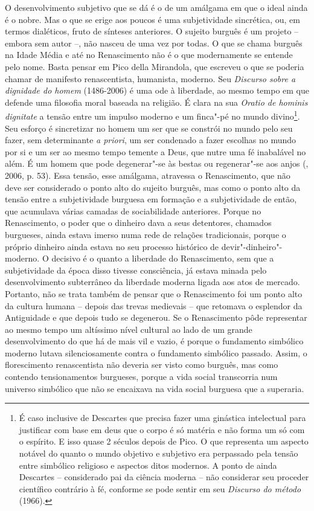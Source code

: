 O desenvolvimento subjetivo que se dá é o de um amálgama em que o ideal
ainda é o nobre. Mas o que se erige aos poucos é uma subjetividade
sincrética, ou, em termos dialéticos, fruto de sínteses anteriores. O
sujeito burguês é um projeto -- embora sem autor --, não nasceu de uma
vez por todas. O que se chama burguês na Idade Média e até no
Renascimento não é o que modernamente se entende pelo nome. Basta pensar
em Pico della Mirandola, que escreveu o que se poderia chamar de
manifesto renascentista, humanista, moderno. Seu \emph{Discurso sobre a
dignidade do homem} (1486-2006) é uma ode à liberdade, ao mesmo tempo em
que defende uma filosofia moral baseada na religião. É clara na sua
\emph{Oratio de hominis dignitate} a tensão entre um impulso moderno e
um finca"-pé no mundo divino\footnote{É caso inclusive de Descartes que
  precisa fazer uma ginástica intelectual para justificar com base em
  deus que o corpo é só matéria e não forma um só com o espírito. E isso
  quase 2 séculos depois de Pico. O que representa um aspecto notável do
  quanto o mundo objetivo e subjetivo era perpassado pela tensão entre
  simbólico religioso e aspectos ditos modernos. A ponto de ainda
  Descartes -- considerado pai da ciência moderna -- não considerar seu
  proceder científico contrário à fé, conforme se pode sentir em seu
  \emph{Discurso do método} (1966).}. Seu esforço é sincretizar no homem
um ser que se constrói no mundo pelo seu fazer, sem determinante \emph{a
priori}, um ser condenado a fazer escolhas no mundo por si e um ser ao
mesmo tempo temente a Deus, que nutre uma fé inabalável no além. É um
homem que pode degenerar"-se às bestas ou regenerar"-se aos anjos
(, 2006, p. 53). Essa tensão, esse amálgama, atravessa o
Renascimento, que não deve ser considerado o ponto alto do sujeito
burguês, mas como o ponto alto da tensão entre a subjetividade burguesa
em formação e a subjetividade de então, que acumulava várias camadas de
sociabilidade anteriores. Porque no Renascimento, o poder que o dinheiro
dava a seus detentores, chamados burgueses, ainda estava imerso numa
rede de relações tradicionais, porque o próprio dinheiro ainda estava no
seu processo histórico de devir"-dinheiro"-moderno. O decisivo é o quanto
a liberdade do Renascimento, sem que a subjetividade da época disso
tivesse consciência, já estava minada pelo desenvolvimento subterrâneo
da liberdade moderna ligada aos atos de mercado. Portanto, não se trata
também de pensar que o Renascimento foi um ponto alto da cultura humana
-- depois das trevas medievais -- que retomava o esplendor da
Antiguidade e que depois tudo se degenerou. Se o Renascimento pôde
representar ao mesmo tempo um altíssimo nível cultural ao lado de um
grande desenvolvimento do que há de mais vil e vazio, é porque o
fundamento simbólico moderno lutava silenciosamente contra o fundamento
simbólico passado. Assim, o florescimento renascentista não deveria ser
visto como burguês, mas como contendo tensionamentos burgueses, porque a
vida social transcorria num universo simbólico que não se encaixava na
vida social burguesa que a superaria.

